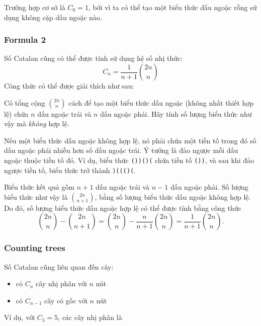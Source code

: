 Trường hợp cơ sở là $C_0=1$,
bởi vì ta có thể tạo một biểu thức
dấu ngoặc rỗng sử dụng không cặp dấu ngoặc nào.

\subsubsection{Formula 2}

Số Catalan cũng có thể được tính
sử dụng hệ số nhị thức:
\[ C_n = \frac{1}{n+1} {2n \choose n}\]
Công thức có thể được giải thích như sau:

Có tổng cộng ${2n \choose n}$ cách
để tạo một biểu thức dấu ngoặc (không nhất thiết hợp lệ)
chứa $n$ dấu ngoặc trái và
$n$ dấu ngoặc phải.
Hãy tính số lượng biểu thức như vậy
mà \emph{không} hợp lệ.

Nếu một biểu thức dấu ngoặc không hợp lệ,
nó phải chứa một tiền tố trong đó
số dấu ngoặc phải nhiều hơn
số dấu ngoặc trái.
Ý tưởng là đảo ngược mỗi dấu ngoặc
thuộc tiền tố đó.
Ví dụ, biểu thức
\texttt{())()(} chứa tiền tố \texttt{())},
và sau khi đảo ngược tiền tố,
biểu thức trở thành \texttt{)((()(}.

Biểu thức kết quả gồm $n+1$
dấu ngoặc trái và $n-1$ dấu ngoặc phải.
Số lượng biểu thức như vậy là ${2n \choose n+1}$,
bằng số lượng biểu thức dấu ngoặc
không hợp lệ.
Do đó, số lượng biểu thức dấu ngoặc
hợp lệ có thể được tính bằng công thức
\[{2n \choose n}-{2n \choose n+1} = {2n \choose n} - \frac{n}{n+1} {2n \choose n} = \frac{1}{n+1} {2n \choose n}.\]

\subsubsection{Counting trees}

Số Catalan cũng liên quan đến cây:

\begin{itemize}
\item có $C_n$ cây nhị phân với $n$ nút
\item có $C_{n-1}$ cây có gốc với $n$ nút
\end{itemize}
\noindent
Ví dụ, với $C_3=5$, các cây nhị phân là


